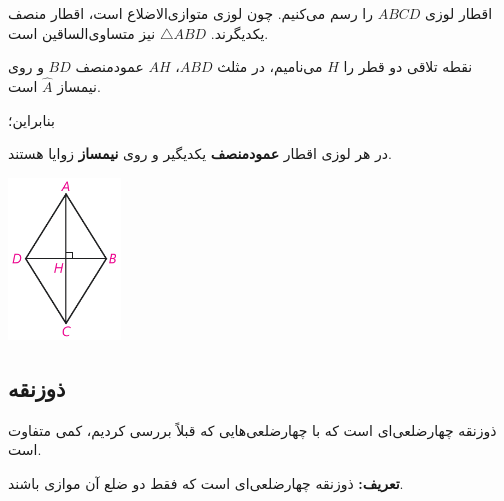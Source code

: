 \documentclass[12pt, a4paper, twoside]{book}
\begin{document}
\begin{minipage}{.8\textwidth}
	اقطار لوزی
	$ABCD$
	را رسم می‌کنیم. چون لوزی متوازی‌الاضلاع است، اقطار منصف یکدیگرند. 
	$
	\triangle ABD
	$
	نیز متساوی‌الساقین است.
	
	نقطه تلاقی دو قطر را
	$H$
	می‌نامیم، در مثلث
	$ABD$،
	$AH$
	عمودمنصف
	$BD$
	و روی نیمساز 
	$
	\widehat{A}
	$
	است.
	
	بنابراین؛
	\newline \smallskip
	
	{\large در هر لوزی اقطار \textbf{عمودمنصف} یکدیگیر و روی \textbf{نیمساز} زوایا هستند.}

\end{minipage}
\begin{minipage}{.2\textwidth}
	\begin{flushleft}
		\includegraphics[width=3cm]{"Shapes/Fasl - 3/Dars 1/2-3.1.pdf"}
	\end{flushleft}
\end{minipage}
\newpage

\subsection{ذوزنقه}
ذوزنقه چهارضلعی‌ای است که با چهارضلعی‌هایی که قبلاً بررسی کردیم، کمی متفاوت است.

\textbf{تعریف:} ذوزنقه چهارضلعی‌ای است که فقط دو ضلع آن موازی باشند.
\end{document}
